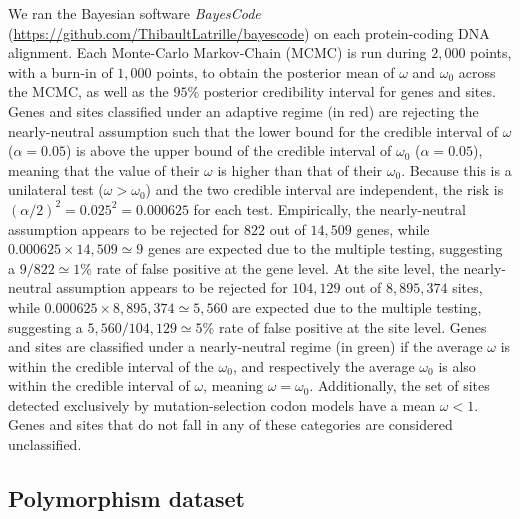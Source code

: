 \documentclass[9pt,twocolumn,twoside,lineno]{pnas-new}
\begin{document}
{       We ran the Bayesian software \textit{BayesCode} (\url{https://github.com/ThibaultLatrille/bayescode}) on each protein-coding DNA alignment\cite{rodrigue_bayesian_2021}.
       Each Monte-Carlo Markov-Chain (MCMC) is run during $2,000$ points, with a burn-in of $1,000$ points, to obtain the posterior mean of $\omega$ and $\omega_{0}$ across the MCMC, as well as the $95$\% posterior credibility interval for genes and sites.
       Genes and sites classified under an adaptive regime (in red) are rejecting the nearly-neutral assumption such that the lower bound for the credible interval of $\omega$ ($\alpha=0.05$) is above the upper bound of the credible interval of $\omega_{0}$ ($\alpha=0.05$), meaning that the value of their $\omega$ is higher than that of their $\omega_{0}$.
       Because this is a unilateral test ($\omega > \omega_{0}$) and the two credible interval are independent, the risk is $(\alpha/2)^2=0.025^2=0.000625$ for each test.
       Empirically, the nearly-neutral assumption appears to be rejected for $822$ out of $14,509$ genes, while $0.000625 \times 14,509 \simeq 9$ genes are expected due to the multiple testing, suggesting a $9 / 822 \simeq 1\%$ rate of false positive at the gene level.
       At the site level, the nearly-neutral assumption appears to be rejected for $104,129$ out of $8,895,374$ sites, while $0.000625 \times 8,895,374 \simeq 5,560$ are expected due to the multiple testing, suggesting a $5,560 / 104,129 \simeq 5\%$ rate of false positive at the site level.
       Genes and sites are classified under a nearly-neutral regime (in green) if the average $\omega$ is within the credible interval of the $\omega_{0}$, and respectively the average $\omega_{0}$ is also within the credible interval of  $\omega$, meaning $\omega = \omega_{0}$.
       Additionally, the set of sites detected exclusively by mutation-selection codon models have a mean $\omega < 1 $.
       Genes and sites that do not fall in any of these categories are considered unclassified.

       \subsection*{Polymorphism dataset}

}
\end{document}
